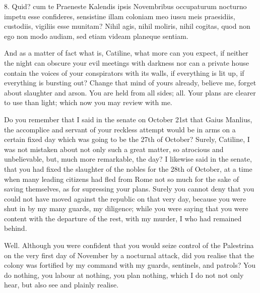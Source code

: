 {  %
  8. Quid? cum te Praeneste Kalendis ipsis Novembribus occupaturum nocturno impetu esse confideres, sensistine illam coloniam meo iussu meis praesidiis, custodiis, vigiliis esse munitam? Nihil agis, nihil moliris, nihil cogitas, quod non ego non modo audiam, sed etiam videam planeque sentiam.
}{
  And as a matter of fact what is, Catiline, what more can you expect, if neither the night can obscure your evil meetings with darkness nor can a private house contain the voices of your conspirators with its walls, if everything is lit up, if everything is bursting out? Change that mind of yours already, believe me, forget about slaughter and arson. You are held from all sides; all. Your plans are clearer to use than light; which now you may review with me.

  Do you remember that I said in the senate on October 21st that Gaius Manlius, the accomplice and servant of your reckless attempt would be in arms on a certain fixed day which was going to be the 27th of October? Surely, Catiline, I was not mistaken about not only such a great matter, so atrocious and unbelievable, but, much more remarkable, the day? I likewise said in the senate, that you had fixed the slaughter of the nobles for the 28th of October, at a time when many leading citizens had fled from Rome not so much for the sake of saving themselves, as for supressing your plans. Surely you cannot deny that you could not have moved against the republic on that very day, because you were shut in by my many guards, my diligence; while you were saying that you were content with the departure of the rest, with my murder, I who had remained behind.

  Well. Although you were confident that you would seize control of the Palestrina on the very first day of November by a nocturnal attack, did you realise that the colony was fortified by my command with my guards, sentinels, and patrols? You do nothing, you labour at nothing, you plan nothing, which I do not not only hear, but also see and plainly realise.
}
